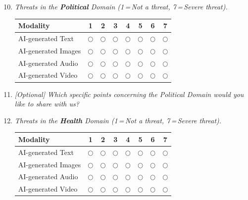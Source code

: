 \begin{enumerate}[label=\textbf{Q\arabic*.}, leftmargin=3em]
\setcounter{enumi}{9}

    \item \textit{Threats in the \textbf{Political} Domain (1\,=\,Not a threat, 7\,=\,Severe threat).}

    \medskip
    \noindent\begin{tabular}{l ccccccc}
    \toprule
    \textbf{Modality} & \textbf{1} & \textbf{2} & \textbf{3} & \textbf{4} & \textbf{5} & \textbf{6} & \textbf{7} \\
    \midrule
    AI-generated Text   & $\bigcirc$ & $\bigcirc$ & $\bigcirc$ & $\bigcirc$ & $\bigcirc$ & $\bigcirc$ & $\bigcirc$ \\
    AI-generated Images & $\bigcirc$ & $\bigcirc$ & $\bigcirc$ & $\bigcirc$ & $\bigcirc$ & $\bigcirc$ & $\bigcirc$ \\
    AI-generated Audio  & $\bigcirc$ & $\bigcirc$ & $\bigcirc$ & $\bigcirc$ & $\bigcirc$ & $\bigcirc$ & $\bigcirc$ \\
    AI-generated Video  & $\bigcirc$ & $\bigcirc$ & $\bigcirc$ & $\bigcirc$ & $\bigcirc$ & $\bigcirc$ & $\bigcirc$ \\
    \bottomrule
    \end{tabular}

    \item \textit{[Optional] Which specific points concerning the Political Domain would you like to share with us?}\\[2pt]
    \framebox[\linewidth]{\rule{0pt}{2em}}

    \item \textit{Threats in the \textbf{Health} Domain (1\,=\,Not a threat, 7\,=\,Severe threat).}

    \medskip
    \noindent\begin{tabular}{l ccccccc}
    \toprule
    \textbf{Modality} & \textbf{1} & \textbf{2} & \textbf{3} & \textbf{4} & \textbf{5} & \textbf{6} & \textbf{7} \\
    \midrule
    AI-generated Text   & $\bigcirc$ & $\bigcirc$ & $\bigcirc$ & $\bigcirc$ & $\bigcirc$ & $\bigcirc$ & $\bigcirc$ \\
    AI-generated Images & $\bigcirc$ & $\bigcirc$ & $\bigcirc$ & $\bigcirc$ & $\bigcirc$ & $\bigcirc$ & $\bigcirc$ \\
    AI-generated Audio  & $\bigcirc$ & $\bigcirc$ & $\bigcirc$ & $\bigcirc$ & $\bigcirc$ & $\bigcirc$ & $\bigcirc$ \\
    AI-generated Video  & $\bigcirc$ & $\bigcirc$ & $\bigcirc$ & $\bigcirc$ & $\bigcirc$ & $\bigcirc$ & $\bigcirc$ \\
    \bottomrule
    \end{tabular}


\end{enumerate}
